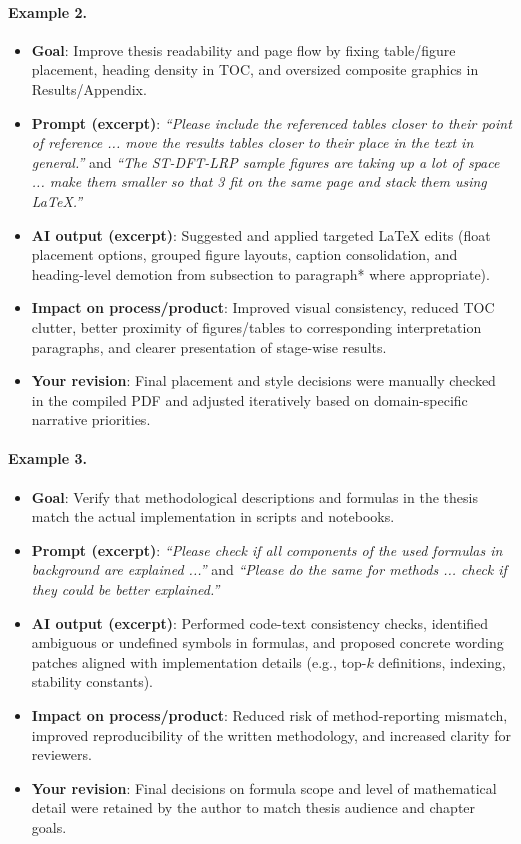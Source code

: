 \paragraph{Example 2.}
\begin{itemize}
  \item \textbf{Goal}: Improve thesis readability and page flow by fixing table/figure placement, heading density in TOC, and oversized composite graphics in Results/Appendix.
  \item \textbf{Prompt (excerpt)}: \emph{``Please include the referenced tables closer to their point of reference ... move the results tables closer to their place in the text in general.''} and \emph{``The ST-DFT-LRP sample figures are taking up a lot of space ... make them smaller so that 3 fit on the same page and stack them using LaTeX.''}
  \item \textbf{AI output (excerpt)}: Suggested and applied targeted LaTeX edits (float placement options, grouped figure layouts, caption consolidation, and heading-level demotion from subsection to paragraph* where appropriate).
  \item \textbf{Impact on process/product}: Improved visual consistency, reduced TOC clutter, better proximity of figures/tables to corresponding interpretation paragraphs, and clearer presentation of stage-wise results.
  \item \textbf{Your revision}: Final placement and style decisions were manually checked in the compiled PDF and adjusted iteratively based on domain-specific narrative priorities.
\end{itemize}

\paragraph{Example 3.}
\begin{itemize}
  \item \textbf{Goal}: Verify that methodological descriptions and formulas in the thesis match the actual implementation in scripts and notebooks.
  \item \textbf{Prompt (excerpt)}: \emph{``Please check if all components of the used formulas in background are explained ...''} and \emph{``Please do the same for methods ... check if they could be better explained.''}
  \item \textbf{AI output (excerpt)}: Performed code-text consistency checks, identified ambiguous or undefined symbols in formulas, and proposed concrete wording patches aligned with implementation details (e.g., top-$k$ definitions, indexing, stability constants).
  \item \textbf{Impact on process/product}: Reduced risk of method-reporting mismatch, improved reproducibility of the written methodology, and increased clarity for reviewers.
  \item \textbf{Your revision}: Final decisions on formula scope and level of mathematical detail were retained by the author to match thesis audience and chapter goals.
\end{itemize}


